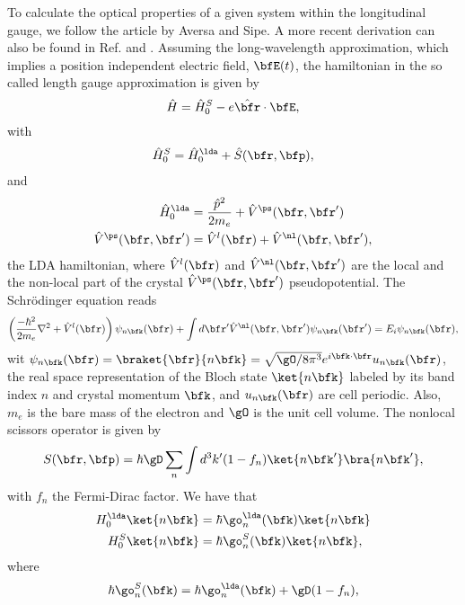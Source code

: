 \documentclass[floatfix,prb,aps,superscriptaddress,11pt,preprint,letterpaper]{revtex4}
\begin{document}
To calculate the optical properties of a given system
within the longitudinal gauge, we follow the article by
Aversa and Sipe.\cite{aversaPRB95} A more recent derivation can also be
found in
Ref. \cite{sipe_second-order_2000} and \cite{lambrecht_band_2000}.
 Assuming the long-wavelength approximation,
which implies a position independent electric field, 
$\bfE(t)$,  
the hamiltonian in the so called length gauge approximation
is given by
\begin{equation}\label{ache}
\hat{H}=\hat{H}^S_0-e \hat\bfr \cdot \bfE,
\end{equation}
with
\begin{align}\label{ache.1}
\hat H^S_0=\hat H^\lda_0
 + \hat S(\bfr,\bfp)
,
\end{align} 
and
\begin{align}\label{ache.2}
\hat H^\lda_0&=\frac{\hat p^2}{2m_e}  + \hat V^\ps(\bfr,\bfr')
\nonumber\\
\hat V^\ps(\bfr,\bfr')
&=\hat V^l(\bfr) + \hat V^\nl(\bfr,\bfr')
,
\end{align}  
the LDA hamiltonian, 
where $\hat V^l(\bfr)$ and $\hat V^\nl(\bfr,\bfr')$ are the local and
the non-local part of the  
crystal $\hat V^\ps(\bfr,\bfr')$ pseudopotential.
The Schr\"odinger equation reads
\begin{align}\label{ache.4} 
\left(
\frac{-\hbar^2}{2m_e}\nabla^2
 + \hat V^l(\bfr)\right)\psi_{n\bfk}(\bfr)
 + \int d\bfr'\hat V^\nl(\bfr,\bfr')\psi_{n\bfk}(\bfr')
=E_i\psi_{n\bfk}(\bfr)
,
\end{align} 
wit
$\psi_{n\bfk}(\bfr)=\braket{\bfr}{n\bfk}=\sqrt{\gO/8\pi^3}e^{i\bfk\cdot\bfr}u_{n\bfk}(\bfr)$,
 the real space
representation of the Bloch state $\ket{n\bfk}$
labeled
by  its
band index $n$ and crystal momentum $\bfk$, and
$u_{n\bfk}(\bfr)$ are cell periodic. 
Also, 
$m_e$ is the 
bare mass of the 
electron and
$\gO$ is the unit cell volume. 
The nonlocal scissors operator is given by 
\begin{equation}\label{chon.0}
S(\bfr,\bfp)=\hbar\gD\sum_n\int d^3k'(1-f_n) \ket{n\bfk'}\bra{n\bfk'}
,
\end{equation}
with $f_n$ the Fermi-Dirac factor.
We have that
\begin{align}\label{chon.1}  
H^\lda_0\ket{n\bfk}&=\hbar\go^\lda_n(\bfk)\ket{n\bfk}
\nonumber\\
H^S_0\ket{n\bfk}&=\hbar\go^S_n(\bfk)\ket{n\bfk}
,
\end{align} 
where 
\begin{align}\label{chon.78}
\hbar\go^S_n(\bfk)=\hbar\go^\lda_n(\bfk)+\gD(1-f_n)
,
\end{align}
\end{document}
